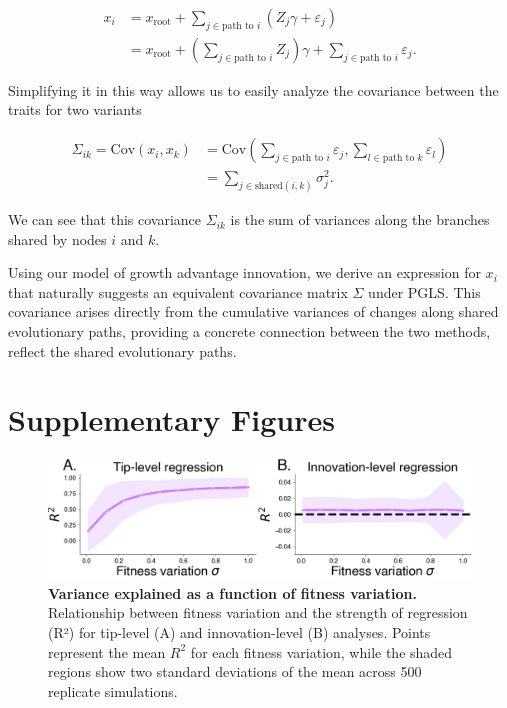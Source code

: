 \begin{align}
    x_i &= x_{\text{root}} + \sum_{j \in \text{path to } i} (Z_j \gamma + \varepsilon_j)\\
	&= x_{\text{root}} + \left( \sum_{j \in \text{path to } i} Z_j \right) \gamma + \sum_{j \in \text{path to } i} \varepsilon_j.
\end{align}

Simplifying it in this way allows us to easily analyze the covariance between the traits for two variants

\begin{align}
    \Sigma_{ik} = \text{Cov}(x_i, x_k) &= \text{Cov} \left( \sum_{j \in \text{path to } i} \varepsilon_j, \sum_{l \in \text{path to } k} \varepsilon_l \right)\\
		&= \sum_{j \in \text{shared}(i, k)} \sigma_j^2.
\end{align}

We can see that this covariance $\Sigma_{ik}$ is the sum of variances along the branches shared by nodes $i$ and $k$. 

Using our model of growth advantage innovation, we derive an expression for $x_i$ that naturally suggests an equivalent covariance matrix $\Sigma$ under PGLS.
This covariance arises directly from the cumulative variances of changes along shared evolutionary paths, providing a concrete connection between the two methods, reflect the shared evolutionary paths.


\section{Supplementary Figures}

\begin{figure}[h]
	\centering
	\includegraphics[width=1.0\textwidth]{./supplementary_figures/synthetic-fitness-variation-correlation.png}
	\caption[\textbf{Variance explained as a function of fitness variation.}]{\textbf{Variance explained as a function of fitness variation.}
	    Relationship between fitness variation and the strength of regression (R²) for tip-level (A) and innovation-level (B) analyses.
	    Points represent the mean $R^2$ for each fitness variation, while the shaded regions show two standard deviations of the mean across 500 replicate simulations.
	}
	\label{fig:fitness-variation-variance-explained}
\end{figure}

